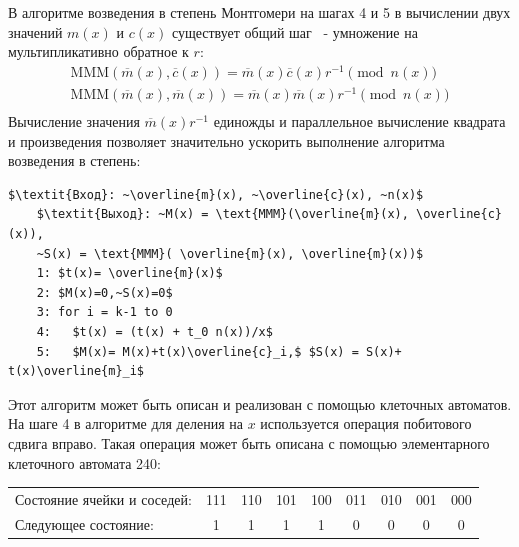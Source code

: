 \documentclass[times,specification,annotation]{itmo-student-thesis}
\begin{document}
В алгоритме возведения в степень Монтгомери на шагах 4 и 5 в вычислении двух значений
$m(x)$ и $c(x)$ существует общий шаг~\cite{ku04} - умножение на мультипликативно обратное к $r$:
\begin{gather*}
  \text{MMM}(\overline{m}(x), \overline{c}(x)) = \overline{m}(x)\overline{c}(x)r^{-1} \pmod{n(x)}\\
  \text{MMM}(\overline{m}(x), \overline{m}(x)) = \overline{m}(x)\overline{m}(x)r^{-1} \pmod{n(x)}\\
\end{gather*}
Вычисление значения $\overline{m}(x)r^{-1}$ единожды и параллельное вычисление квадрата и произведения
позволяет значительно ускорить выполнение алгоритма возведения в степень:
\begin{lstlisting}[breaklines=true, mathescape=true]
    $\textit{Вход}: ~\overline{m}(x), ~\overline{c}(x), ~n(x)$
    $\textit{Выход}: ~M(x) = \text{MMM}(\overline{m}(x), \overline{c}(x)),
    ~S(x) = \text{MMM}( \overline{m}(x), \overline{m}(x))$
    1: $t(x)= \overline{m}(x)$
    2: $M(x)=0,~S(x)=0$
    3: for i = k-1 to 0
    4:   $t(x) = (t(x) + t_0 n(x))/x$
    5:   $M(x)= M(x)+t(x)\overline{c}_i,$ $S(x) = S(x)+ t(x)\overline{m}_i$
\end{lstlisting}

Этот алгоритм может быть описан и реализован с помощью клеточных автоматов.
На шаге 4 в алгоритме для деления на $x$ используется операция побитового сдвига вправо.
Такая операция может быть описана с помощью элементарного клеточного автомата 240:
\begin{table}[h]
    \begin{tabular}{ l l l l l l l l l }
    Состояние ячейки и соседей: & 111 & 110 & 101 & 100 & 011 & 010 & 001 & 000 \\
    Следующее состояние: & ~1 & ~1 & ~1 & ~1 & ~0 & ~0 & ~0 & ~0 \\
    \end{tabular}
\end{table}
\end{document}
